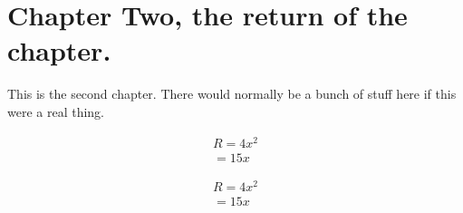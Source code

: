 \chapter{Chapter Two, the return of the chapter.}

This is the second chapter. There would normally be a bunch of stuff here if this were a real thing.

\begin{multline}
R = 4x^2\\
= 15x
\end{multline}

\begin{multline*}
R = 4x^2\\
= 15x
\end{multline*}


